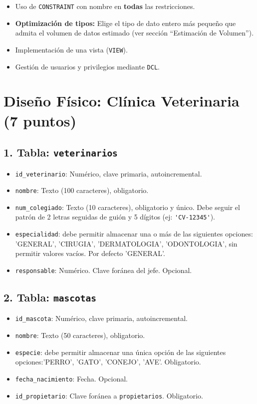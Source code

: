 \documentclass[a4paper,11pt]{article}
\begin{document}
\begin{Form}
\begin{tcolorbox}[colback=blue!5!white,colframe=blue!75!black,title=\textbf{REQUISITOS TÉCNICOS}]
\begin{itemize}
    \item Uso de \texttt{CONSTRAINT} con nombre en \textbf{todas} las restricciones.
    \item \textbf{Optimización de tipos:} Elige el tipo de dato entero más pequeño que admita el volumen de datos estimado (ver sección \enquote{Estimación de Volumen}).
    \item Implementación de una vista (\texttt{VIEW}).
    \item Gestión de usuarios y privilegios mediante \texttt{DCL}.
\end{itemize}
\end{tcolorbox}

\section{Diseño Físico: Clínica Veterinaria (7 puntos)}


\subsection*{1. Tabla: \texttt{veterinarios}}
\begin{itemize}
    \item \texttt{id\_veterinario}: Numérico, clave primaria, autoincremental.
    \item \texttt{nombre}: Texto (100 caracteres), obligatorio.
    \item \texttt{num\_colegiado}: Texto (10 caracteres), obligatorio y único. Debe seguir el patrón de 2 letras seguidas de guión y 5 dígitos (ej: \lstinline{'CV-12345'}).
    \item \texttt{especialidad}: debe permitir almacenar una o más de las siguientes opciones: 'GENERAL', 'CIRUGIA', 'DERMATOLOGIA', 'ODONTOLOGIA', sin permitir valores vacíos. Por defecto 'GENERAL'.
    \item \texttt{responsable}: Numérico. Clave foránea del jefe. Opcional.
\end{itemize}

\subsection*{2. Tabla: \texttt{mascotas}}
\begin{itemize}
    \item \texttt{id\_mascota}: Numérico, clave primaria, autoincremental.
    \item \texttt{nombre}: Texto (50 caracteres), obligatorio.
    \item \texttt{especie}: debe permitir almacenar una única opción de las siguientes opciones:'PERRO', 'GATO', 'CONEJO', 'AVE'. Obligatorio.
    \item \texttt{fecha\_nacimiento}: Fecha. Opcional.
    \item \texttt{id\_propietario}: Clave foránea a \texttt{propietarios}. Obligatorio. 
\end{itemize}


\end{Form}
\end{document}
